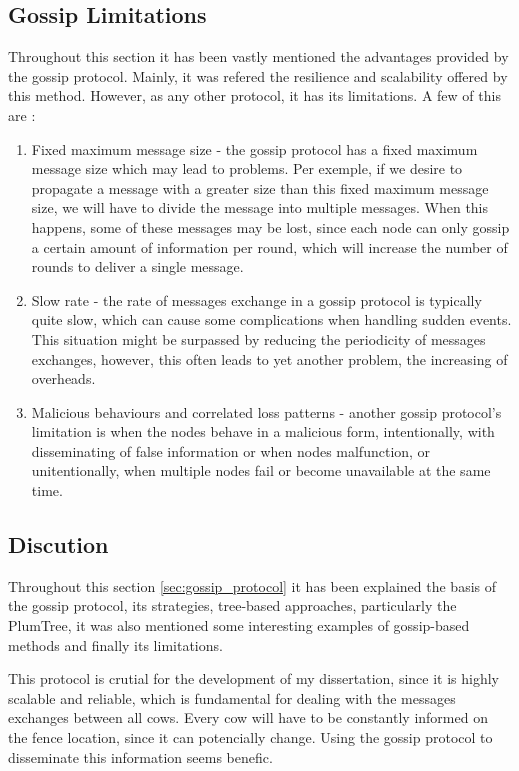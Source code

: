 \subsection{Gossip Limitations}
\label{subsec:gossip_limitations}
Throughout this section it has been vastly mentioned the advantages provided by the gossip
protocol. Mainly, it was refered the resilience and scalability offered by this method.
However, as any other protocol, it has its limitations. A few of this are \cite{Birman2007}:
\begin{enumerate}
    \item Fixed maximum message size - the gossip protocol has a fixed maximum message size
          which may lead to problems. Per exemple, if we desire to propagate a message with a
          greater size than this fixed maximum message size, we will have to divide the message
          into multiple messages. When this happens, some of these messages may be lost, since
          each node can only gossip a certain amount of information per round, which will
          increase the number of rounds to deliver a single message.
    \item Slow rate - the rate of messages exchange in a gossip protocol is typically quite
          slow, which can cause some complications when handling sudden events. This situation
          might be surpassed by reducing the periodicity of messages exchanges, however, this
          often leads to yet another problem, the increasing of overheads.
    \item Malicious behaviours and correlated loss patterns - another gossip protocol's limitation
          is when the nodes behave in a malicious form, intentionally, with disseminating of
          false information or when nodes malfunction, or unitentionally, when multiple nodes
          fail or become unavailable at the same time.
\end{enumerate}


\subsection{Discution}
\label{subsec:gossip_discution}
Throughout this section \ref{sec:gossip_protocol} it has been explained the basis of the
gossip protocol, its strategies, tree-based approaches, particularly the PlumTree, it was
also mentioned some interesting examples of gossip-based methods and finally its limitations.

This protocol is crutial for the development of my dissertation, since it is highly scalable
and reliable, which is fundamental for dealing with the messages exchanges between all cows.
Every cow will have to be constantly informed on the fence location, since it can potencially
change. Using the gossip protocol to disseminate this information seems benefic.

